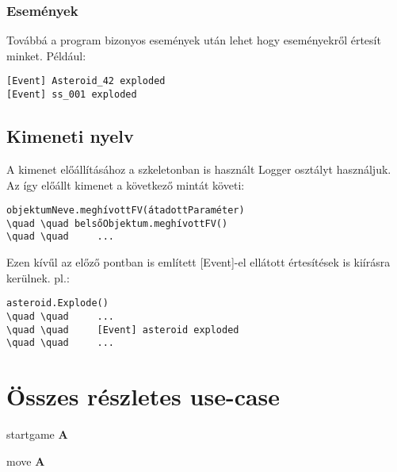 \documentclass[../../projlab]{subfiles}
\begin{document}
\subsubsection{Események}
Továbbá a program bizonyos események után lehet hogy eseményekről értesít minket.
Például:
\begin{verbatim}
[Event] Asteroid_42 exploded
[Event] ss_001 exploded
\end{verbatim}


\subsection{Kimeneti nyelv}

A kimenet előállításához a szkeletonban is használt Logger osztályt használjuk.
Az így előállt kimenet a következő mintát követi:
\begin{verbatim}
objektumNeve.meghívottFV(átadottParaméter)
\quad \quad belsőObjektum.meghívottFV()
\quad \quad 	...
\end{verbatim}

Ezen kívűl az előző pontban is említett [Event]-el ellátott értesítések is kiírásra kerülnek.
pl.:
\begin{verbatim}
asteroid.Explode()
\quad \quad 	...
\quad \quad 	[Event] asteroid exploded
\quad \quad 	...
\end{verbatim}



\section{Összes részletes use-case}
\begin{use-case}
    {startgame}
    { }
    {} 
    \textbf{A} \newline

\end{use-case}

\begin{use-case}
    {move}
    { }
    {} 
    \textbf{A} \newline

\end{use-case}
\end{document}
